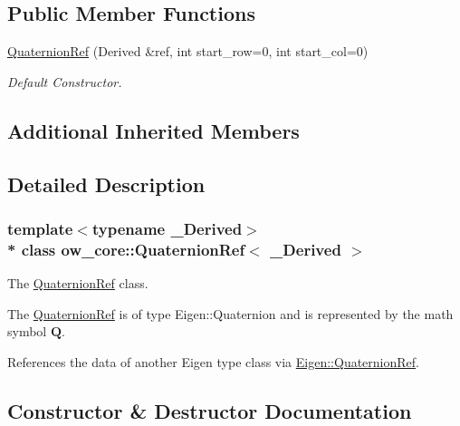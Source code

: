 \subsection*{Public Member Functions}
\begin{DoxyCompactItemize}
\item 
\hyperlink{classow__core_1_1QuaternionRef_a9497ab05ee716ffe17ce7799b2125feb}{Quaternion\+Ref} (Derived \&ref, int start\+\_\+row=0, int start\+\_\+col=0)
\begin{DoxyCompactList}\small\item\em Default Constructor. \end{DoxyCompactList}\end{DoxyCompactItemize}
\subsection*{Additional Inherited Members}


\subsection{Detailed Description}
\subsubsection*{template$<$typename \+\_\+\+Derived$>$\\*
class ow\+\_\+core\+::\+Quaternion\+Ref$<$ \+\_\+\+Derived $>$}

The \hyperlink{classow__core_1_1QuaternionRef}{Quaternion\+Ref} class. 

The \hyperlink{classow__core_1_1QuaternionRef}{Quaternion\+Ref} is of type Eigen\+::\+Quaternion and is represented by the math symbol $\mathbf{Q}$.

References the data of another Eigen type class via \hyperlink{classEigen_1_1QuaternionRef}{Eigen\+::\+Quaternion\+Ref}. 

\subsection{Constructor \& Destructor Documentation}
